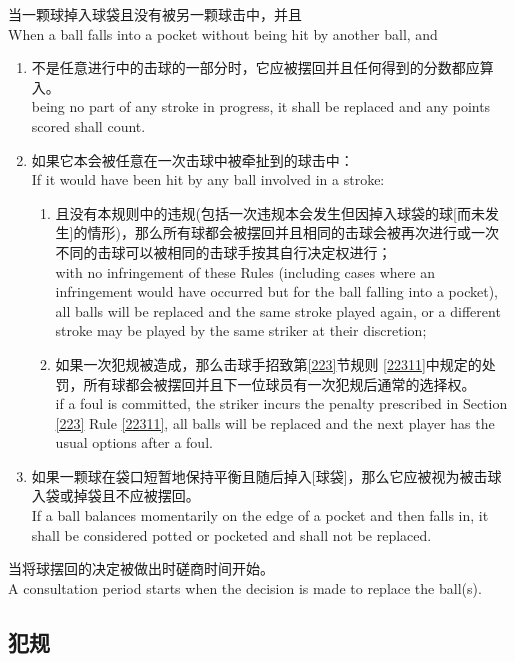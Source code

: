 \noindent 当一颗球掉入球袋且没有被另一颗球击中，并且\\
When a ball falls into a pocket without being hit by another ball, and
\begin{enumerate}[label=(\alph*)]
    \item 不是任意进行中的击球的一部分时，它应被摆回并且任何得到的分数都应算入。\\
    being no part of any stroke in progress, it shall be replaced and any points scored shall count.
    \item 如果它本会被任意在一次击球中被牵扯到的球击中：\\
    If it would have been hit by any ball involved in a stroke:
    \begin{enumerate}[label=(\roman*)]
        \item 且没有本规则中的违规(包括一次违规本会发生但因掉入球袋的球[而未发生]的情形)，那么所有球都会被摆回并且相同的击球会被再次进行或一次不同的击球可以被相同的击球手按其自行决定权进行；\\
        with no infringement of these Rules (including cases where an infringement would have occurred but for the ball falling into a pocket), all balls will be replaced and the same stroke played again, or a different stroke may be played by the same striker at their discretion;
        \item 如果一次犯规被造成，那么击球手招致第\ref{223}节规则 \ref{22311}中规定的处罚，所有球都会被摆回并且下一位球员有一次犯规后通常的选择权。\\
        if a foul is committed, the striker incurs the penalty prescribed in Section \ref{223} Rule \ref{22311}, all balls will be replaced and the next player has the usual options after a foul.
    \end{enumerate}
    \item 如果一颗球在袋口短暂地保持平衡且随后掉入[球袋]，那么它应被视为被击球入袋或掉袋且不应被摆回。\\
    If a ball balances momentarily on the edge of a pocket and then falls in, it shall be considered potted or pocketed and shall not be replaced.
\end{enumerate}
\noindent 当将球摆回的决定被做出时磋商时间开始。\\
A consultation period starts when the decision is made to replace the ball(s).

\subsection{犯规}\label{22310}

